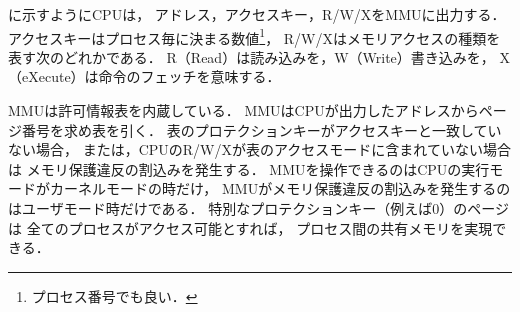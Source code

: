 に示すようにCPUは，
アドレス，アクセスキー，R/W/XをMMUに出力する．
アクセスキーはプロセス毎に決まる数値\footnote{プロセス番号でも良い．}，
R/W/Xはメモリアクセスの種類を表す次のどれかである．
R（Read）は読み込みを，W（Write）書き込みを，
X（eXecute）は命令のフェッチを意味する．

MMUは許可情報表を内蔵している．
MMUはCPUが出力したアドレスからページ番号を求め表を引く．
表のプロテクションキーがアクセスキーと一致していない場合，
または，CPUのR/W/Xが表のアクセスモードに含まれていない場合は
メモリ保護違反の割込みを発生する．
MMUを操作できるのはCPUの実行モードがカーネルモードの時だけ，
MMUがメモリ保護違反の割込みを発生するのはユーザモード時だけである．
特別なプロテクションキー（例えば0）のページは
全てのプロセスがアクセス可能とすれば，
プロセス間の共有メモリを実現できる．

